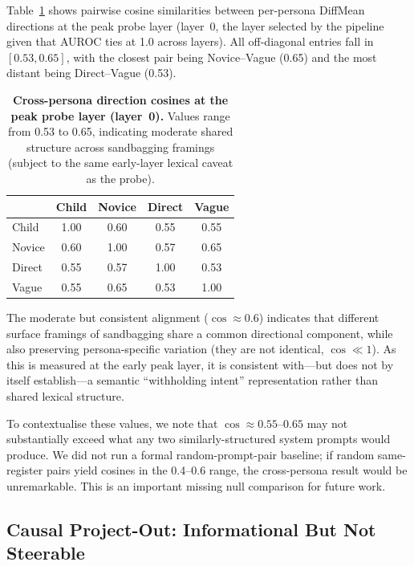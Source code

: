 \documentclass{article}
\begin{document}
Table~\ref{tab:persona} shows pairwise cosine similarities between per-persona DiffMean directions at the peak probe layer (layer~0, the layer selected by the pipeline given that AUROC ties at 1.0 across layers).
All off-diagonal entries fall in $[0.53, 0.65]$, with the closest pair being Novice--Vague (0.65) and the most distant being Direct--Vague (0.53).

\begin{table}[h]
  \centering
  \small
  \caption{\textbf{Cross-persona direction cosines at the peak probe layer (layer~0).} Values range from 0.53 to 0.65, indicating moderate shared structure across sandbagging framings (subject to the same early-layer lexical caveat as the probe).}
  \label{tab:persona}
  \begin{tabular}{lcccc}
    \toprule
    & Child & Novice & Direct & Vague \\
    \midrule
    Child  & 1.00 & 0.60 & 0.55 & 0.55 \\
    Novice & 0.60 & 1.00 & 0.57 & 0.65 \\
    Direct & 0.55 & 0.57 & 1.00 & 0.53 \\
    Vague  & 0.55 & 0.65 & 0.53 & 1.00 \\
    \bottomrule
  \end{tabular}
\end{table}

The moderate but consistent alignment ($\cos \approx 0.6$) indicates that different surface framings of sandbagging share a common directional component, while also preserving persona-specific variation (they are not identical, $\cos \ll 1$). As this is measured at the early peak layer, it is consistent with---but does not by itself establish---a semantic ``withholding intent'' representation rather than shared lexical structure.

To contextualise these values, we note that $\cos \approx 0.55$--$0.65$ may not substantially exceed what any two similarly-structured system prompts would produce. We did not run a formal random-prompt-pair baseline; if random same-register pairs yield cosines in the 0.4--0.6 range, the cross-persona result would be unremarkable. This is an important missing null comparison for future work.

\subsection{Causal Project-Out: Informational But Not Steerable}
\label{sec:res_causal}
\end{document}
